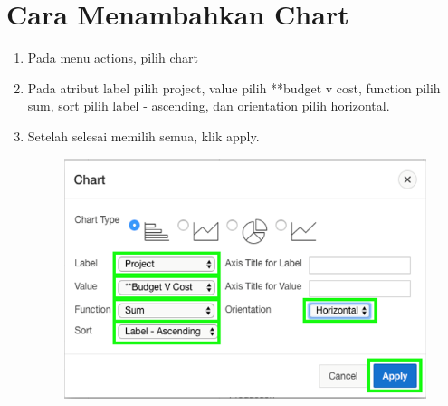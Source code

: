 \section{Cara Menambahkan Chart}
\begin{enumerate}
    \item{Pada menu actions, pilih chart}
    \item{Pada atribut label pilih project, value pilih **budget v cost, function pilih sum, sort pilih label - ascending, dan orientation pilih horizontal.}
    \item{Setelah selesai memilih semua, klik apply.}
\begin{figure}[!htbp]
    \centering
    \includegraphics[scale=0.5]{section/gambar_bab2/chart.png}
    \label{penanda}
\end{figure}
\end{enumerate}

